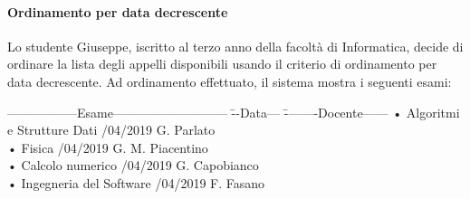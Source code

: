 \paragraph{Ordinamento per data decrescente}
Lo studente Giuseppe, iscritto al terzo anno della facoltà di Informatica, decide di ordinare la lista degli appelli disponibili usando il criterio di ordinamento per data decrescente. Ad ordinamento effettuato, il sistema mostra i seguenti esami:

\begin{tabbing}
	\hspace{1cm}-----------------Esame--------------------------- \= --Data--- \= --------Docente------ \kill
	\hspace{1cm} • Algoritmi e Strutture Dati /04/2019 \> \hspace{1cm} G. Parlato \\
	\hspace{1cm} • Fisica /04/2019 \> \hspace{1cm} G. M. Piacentino  \\
	\hspace{1cm} • Calcolo numerico /04/2019  \> \hspace{1cm} G. Capobianco \\
	\hspace{1cm} • Ingegneria del Software /04/2019   \> \hspace{1cm} F. Fasano \\
	
	
\end{tabbing} 

